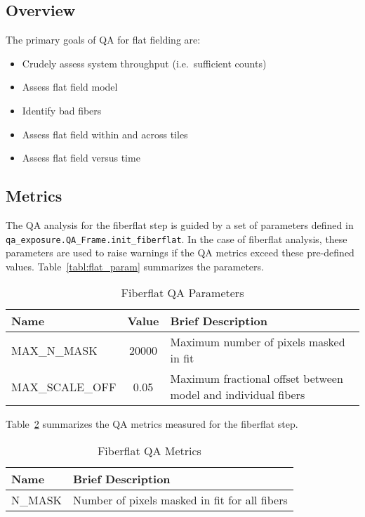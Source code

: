 \documentclass[12pt]{article}
\begin{document}
\subsection{Overview}

The primary goals of QA for flat fielding are:

\begin{itemize}
\item Crudely assess system throughput (i.e.\ sufficient counts)
\item Assess flat field model
\item Identify bad fibers
\item Assess flat field within and across tiles
\item Assess flat field versus time
\end{itemize}

\subsection{Metrics}

The QA analysis for the fiberflat step is guided by a set of 
parameters defined in {\tt qa\_exposure.QA\_Frame.init\_fiberflat}.
In the case of fiberflat analysis, these parameters are used 
to raise warnings if the QA metrics exceed these pre-defined values.
Table~\ref{tabl:flat_param} summarizes the parameters.

\begin{table}[h]
\begin{center}
\caption{Fiberflat QA Parameters}
\label{tab:flat_param}
\begin{tabular}{lcl}
\hline
{\bf Name} & {\bf Value} & {\bf Brief Description}\\
\hline
MAX\_N\_MASK    & 20000 & Maximum number of pixels masked in fit \\
MAX\_SCALE\_OFF & 0.05  & Maximum fractional offset between model and individual fibers \\ 
\hline
\end{tabular}
\end{center}
\end{table}


Table~\ref{tab:flat_metrics} summarizes the QA metrics measured
for the fiberflat step.  

\begin{table}[h]
\begin{center}
\caption{Fiberflat QA Metrics}
\label{tab:flat_metrics}
\begin{tabular}{ll}
\hline
{\bf Name} & {\bf Brief Description}\\
\hline
N\_MASK    & Number of pixels masked in fit for all fibers \\
\hline
\end{tabular}
\end{center}
\end{table}
\end{document}
